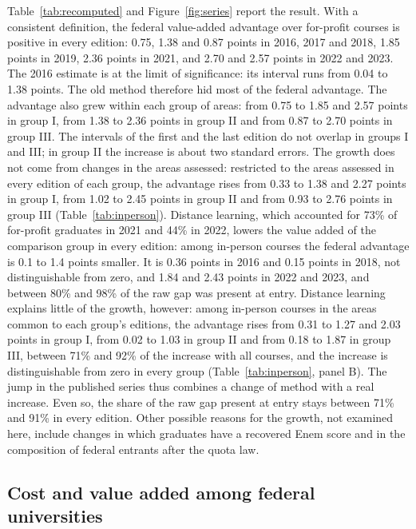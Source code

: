 \documentclass[12pt,letterpaper]{article}
\begin{document}
Table~\ref{tab:recomputed} and Figure~\ref{fig:series} report the result. With a consistent definition, the federal value-added advantage over for-profit courses is positive in every edition: 0.75, 1.38 and 0.87 points in 2016, 2017 and 2018, 1.85 points in 2019, 2.36 points in 2021, and 2.70 and 2.57 points in 2022 and 2023. The 2016 estimate is at the limit of significance: its interval runs from 0.04 to 1.38 points. The old method therefore hid most of the federal advantage. The advantage also grew within each group of areas: from 0.75 to 1.85 and 2.57 points in group I, from 1.38 to 2.36 points in group II and from 0.87 to 2.70 points in group III. The intervals of the first and the last edition do not overlap in groups I and III; in group II the increase is about two standard errors. The growth does not come from changes in the areas assessed: restricted to the areas assessed in every edition of each group, the advantage rises from 0.33 to 1.38 and 2.27 points in group I, from 1.02 to 2.45 points in group II and from 0.93 to 2.76 points in group III (Table~\ref{tab:inperson}). Distance learning, which accounted for 73\% of for-profit graduates in 2021 and 44\% in 2022, lowers the value added of the comparison group in every edition: among in-person courses the federal advantage is 0.1 to 1.4 points smaller. It is 0.36 points in 2016 and 0.15 points in 2018, not distinguishable from zero, and 1.84 and 2.43 points in 2022 and 2023, and between 80\% and 98\% of the raw gap was present at entry. Distance learning explains little of the growth, however: among in-person courses in the areas common to each group's editions, the advantage rises from 0.31 to 1.27 and 2.03 points in group I, from 0.02 to 1.03 in group II and from 0.18 to 1.87 in group III, between 71\% and 92\% of the increase with all courses, and the increase is distinguishable from zero in every group (Table~\ref{tab:inperson}, panel B). The jump in the published series thus combines a change of method with a real increase. Even so, the share of the raw gap present at entry stays between 71\% and 91\% in every edition. Other possible reasons for the growth, not examined here, include changes in which graduates have a recovered Enem score and in the composition of federal entrants after the quota law.

\subsection{Cost and value added among federal universities}
\end{document}
